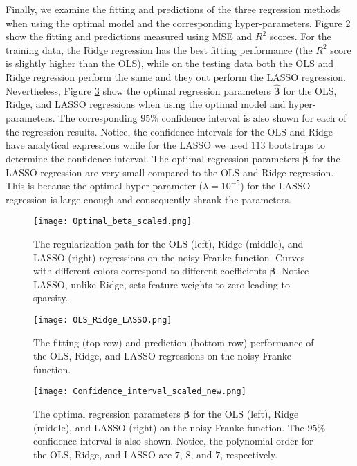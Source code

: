 \documentclass[a4paper]{article}
\begin{document}
Finally, we examine the fitting and predictions of the three regression methods when using the optimal model and the corresponding hyper-parameters. Figure \ref{OLS_Ridge_LASSO_degree} show the fitting and predictions measured using MSE and $R^2$ scores. For the training data, the Ridge regression has the best fitting performance (the $R^2$ score is slightly higher than the OLS), while on the testing data both the OLS and Ridge regression perform the same and they out perform the LASSO regression. Nevertheless, Figure \ref{Confidence_interval} show the optimal regression parameters $\hat{\mathbf{\beta}}$ for the OLS, Ridge, and LASSO regressions when using the optimal model and hyper-parameters. The corresponding $95\%$ confidence interval is also shown for each of the regression results. Notice, the confidence intervals for the OLS and Ridge have analytical expressions while for the LASSO we used $113$ bootstraps to determine the confidence interval. The optimal regression parameters $\hat{\mathbf{\beta}}$ for the LASSO regression are very small compared to the OLS and Ridge regression. This is because the optimal hyper-parameter ($\lambda=10^{-5}$) for the LASSO regression is large enough and consequently shrank the parameters.

\begin{figure}[H]
  \centering
  \texttt{[image: Optimal\_beta\_scaled.png]}
  \caption{The regularization path for the OLS (left), Ridge (middle), and LASSO (right) regressions on the noisy Franke function. Curves with different colors correspond to different coefficients $\mathbf{\beta}$. Notice LASSO, unlike Ridge, sets feature weights to zero leading to sparsity.}
    \label{Optimal_beta}
\end{figure}

\begin{figure}[H]
  \centering
  \texttt{[image: OLS\_Ridge\_LASSO.png]}
  \caption{The fitting (top row) and prediction (bottom row) performance of the OLS, Ridge, and LASSO regressions on the noisy Franke function.}
    \label{OLS_Ridge_LASSO_degree}
\end{figure}


\begin{figure}[H]
  \centering
  \texttt{[image: Confidence\_interval\_scaled\_new.png]}
  \caption{The optimal regression parameters $\mathbf{\beta}$ for the OLS (left), Ridge (middle), and LASSO (right) on the noisy Franke function. The $95\%$ confidence interval is also shown. Notice, the polynomial order for the OLS, Ridge, and LASSO are $7$, $8$, and $7$, respectively.}
    \label{Confidence_interval}
\end{figure}
\end{document}
